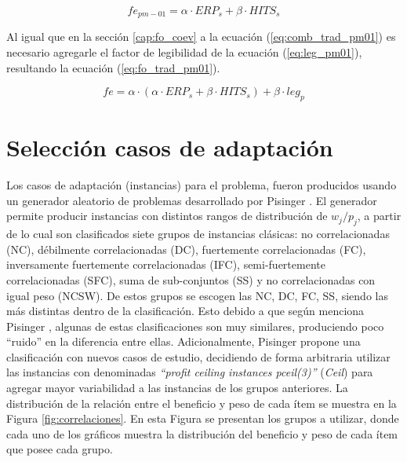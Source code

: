 \begin{equation}
\label{eq:comb_trad_pm01}
	fe_{pm-01} = \alpha\cdot ERP_{s}+ \beta\cdot HITS_{s}
\end{equation}

Al igual que en la sección \ref{cap:fo_coev} a la ecuación (\ref{eq:comb_trad_pm01}) es necesario agregarle el factor de legibilidad de la ecuación (\ref{eq:leg_pm01}), resultando la ecuación (\ref{eq:fo_trad_pm01}).

\begin{equation}
\label{eq:fo_trad_pm01}
	fe = \alpha\cdot(\alpha\cdot ERP_{s}+ \beta\cdot HITS_{s}) + \beta\cdot leg_{p}
\end{equation}

\section{Selección casos de adaptación}
\label{cap:sel_casos_adapt_pm01}

Los casos de adaptación (instancias) para el problema, fueron producidos usando un generador aleatorio de problemas desarrollado por Pisinger \citep{pisinger_2005}. El generador permite producir instancias con distintos rangos de distribución de $w_{j}/p_{j}$, a partir de lo cual son clasificados siete grupos de instancias clásicas: no correlacionadas (NC), débilmente correlacionadas (DC), fuertemente correlacionadas (FC), inversamente fuertemente correlacionadas (IFC), semi-fuertemente correlacionadas (SFC), suma de sub-conjuntos (SS) y no correlacionadas con igual peso (NCSW). De estos grupos se escogen las NC, DC, FC, SS, siendo las más distintas dentro de la clasificación. Esto debido a que según menciona Pisinger \citep{pisinger_2005}, algunas de estas clasificaciones son muy similares, produciendo poco “ruido” en la diferencia entre ellas. Adicionalmente, Pisinger propone una clasificación con nuevos casos de estudio, decidiendo de forma arbitraria utilizar las instancias con denominadas \textit{“profit ceiling instances pceil(3)”} (\textit{Ceil}) para agregar mayor variabilidad a las instancias de los grupos anteriores. La distribución de la relación entre el beneficio y peso de cada ítem se muestra en la Figura \ref{fig:correlaciones}. En esta Figura se presentan los grupos a utilizar, donde cada uno de los gráficos muestra la distribución del beneficio y peso de cada ítem que posee cada grupo.

